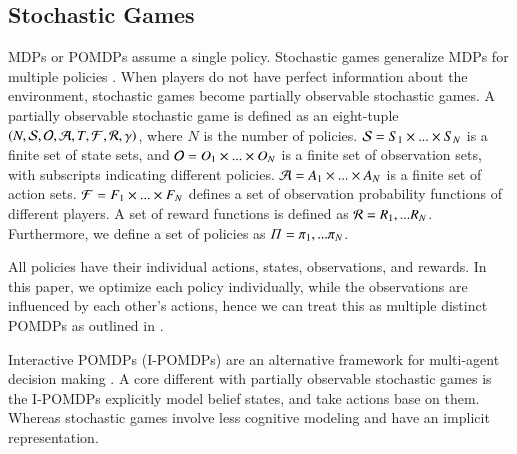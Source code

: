 \subsection{Stochastic Games}
MDPs or POMDPs assume a single policy. Stochastic games generalize MDPs for multiple policies \cite{shapley1953stochastic}. When players do not have perfect information about the environment, stochastic games become partially observable stochastic games. A partially observable stochastic game is defined as an eight-tuple $\left(N, \mathcal{S}, \mathcal{O}, \mathcal{A}, T, \mathcal{F}, \mathcal{R}, \gamma \right )$, where $N$ is the number of policies. $\mathcal{S} = S_1 \times ... \times S_N$ is a finite set of state sets, and $\mathcal{O} = O_1 \times ... \times O_N$ is a finite set of observation sets, with subscripts indicating different policies. $\mathcal{A} = A_1 \times ... \times A_N$ is a finite set of action sets. $\mathcal{F} = {F}_1 \times ... \times {F}_N$ defines a set of observation probability functions of different players. A set of reward functions is defined as $\mathcal{R} = R_1, ... R_N $. Furthermore, we define a set of policies as $\Pi = {\pi_1, ... \pi_N}$.

All policies have their individual actions, states, observations, and rewards. In this paper, we optimize each policy individually, while the observations are influenced by each other's actions, hence we can treat this as multiple distinct POMDPs as outlined in .

Interactive POMDPs (I-POMDPs) are an alternative framework for multi-agent decision making \cite{gmytrasiewicz2004interactive}. A core different with partially observable stochastic games is the I-POMDPs explicitly model belief states, and take actions base on them. Whereas stochastic games involve less cognitive modeling and have an implicit representation. 

